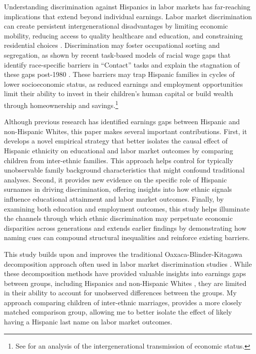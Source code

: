 Understanding discrimination against Hispanics in labor markets has far-reaching implications that extend beyond individual earnings. Labor market discrimination can create persistent intergenerational disadvantages by limiting economic mobility, reducing access to quality healthcare and education, and constraining residential choices \autocite{chettyUnitedStatesStill2014, chettyEffectsExposureBetter2016,chettyFadingAmericanDream2017,bowles2002inheritance, djajic2003assimilation}. Discrimination may foster occupational sorting and segregation, as shown by recent task-based models of racial wage gaps that identify race-specific barriers in “Contact” tasks and explain the stagnation of these gaps post-1980 \autocite{hurst2024task}. These barriers may trap Hispanic families in cycles of lower socioeconomic status, as reduced earnings and employment opportunities limit their ability to invest in their children's human capital or build wealth through homeownership and savings.\footnote{See \textcite{bowles2002inheritance} for an analysis of the intergenerational transmission of economic status.} 

Although previous research has identified earnings gaps between Hispanic and non-Hispanic Whites, this paper makes several important contributions. First, it develops a novel empirical strategy that better isolates the causal effect of Hispanic ethnicity on educational and labor market outcomes by comparing children from inter-ethnic families. This approach helps control for typically unobservable family background characteristics that might confound traditional analyses. Second, it provides new evidence on the specific role of Hispanic surnames in driving discrimination, offering insights into how ethnic signals influence educational attainment and labor market outcomes. Finally, by examining both education and employment outcomes, this study helps illuminate the channels through which ethnic discrimination may perpetuate economic disparities across generations and extends earlier findings by demonstrating how naming cues can compound structural inequalities and reinforce existing barriers.

This study builds upon and improves the traditional Oaxaca-Blinder-Kitagawa decomposition approach often used in labor market discrimination studies \autocite{kitagawa1955components, oaxaca1973male,blinder1973wage}. While these decomposition methods have provided valuable insights into earnings gaps between groups, including Hispanics and non-Hispanic Whites \autocite{davilaChangesRelativeEarnings2008}, they are limited in their ability to account for unobserved differences between the groups. My approach comparing children of inter-ethnic marriages, provides a more closely matched comparison group, allowing me to better isolate the effect of likely having a Hispanic last name on labor market outcomes.

